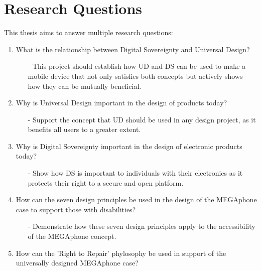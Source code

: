 \section{Research Questions}

This thesis aims to answer multiple research questions:

\begin{enumerate}
    \item What is the relationship between Digital Sovereignty and Universal Design? %
        \begin{enumerate}
        \item[-] This project should establish how UD and DS can be used to make a mobile device that not only satisfies both concepts but actively shows how they can be mutually beneficial.
        \end{enumerate} 
    \item Why is Universal Design important in the design of products today?
        \begin{enumerate}
        \item[-] Support the concept that UD should be used in any design project, as it benefits all users to a greater extent.
        \end{enumerate}
    \item Why is Digital Sovereignty important in the design of electronic products today?
        \begin{enumerate}
        \item[-] Show how DS is important to individuals with their electronics as it protects their right to a secure and open platform.
        \end{enumerate} 
    \item How can the seven design principles be used in the design of the MEGAphone case to support those with disabilities?
        \begin{enumerate}
        \item[-] Demonstrate how these seven design principles apply to the accessibility of the MEGAphone concept.
        \end{enumerate} 
    \item How can the 'Right to Repair' phylosophy be used in support of the universally designed MEGAphone case?
        \begin{enumerate}

\end{enumerate}
\end{enumerate}
